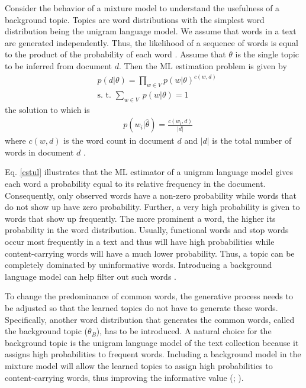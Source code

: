 \documentclass[11pt,a4paper,english,oneside]{book}
\numberwithin{equation}{chapter}
\begin{document}
Consider the behavior of a mixture model to understand the usefulness of a background topic. Topics are word distributions with the simplest word distribution being the unigram language model. We assume that words in a text are generated independently. Thus, the likelihood of a sequence of words is equal to the product of the probability of each word \citep[pp. 51--54]{Zhai.2016}. Assume that $\theta$ is the single topic to be inferred from document $d$. Then the ML estimation problem is given by
\begin{align}
\label{ul} & p(d|\theta) = \underset{w \in V}\prod p(w|\theta)^{c(w,d)}\\
\label{constraintsul} & \text{s. t. } \underset{w \in V}{\sum} \ p(w|\theta) = 1
\end{align}
the solution to which is
\begin{align}
\label{estul} & \ p(w_i|\hat{\theta}) = \frac{c(w_i,d)}{|d|}
\end{align}
where $c(w,d)$ is the word count in document $d$ and $|d|$ is the total number of words in document $d$ \citep[pp. 341--343]{Zhai.2016}. 

Eq. \ref{estul} illustrates that the ML estimator of a unigram language model gives each word a probability equal to its relative frequency in the document. Consequently, only observed words have a non-zero probability while words that do not show up have zero probability. Further, a very high probability is given to words that show up frequently. The more prominent a word, the higher its probability in the word distribution. 
Usually, functional words and stop words occur most frequently in a text and thus will have high probabilities while content-carrying words will have a much lower probability. Thus, a topic can be completely dominated by uninformative words. Introducing a background language model can help filter out such words \citep[pp. 51--54]{Zhai.2016}.  

To change the predominance of common words, the generative process needs to be adjusted so that the learned topics do not have to generate these words. Specifically, another word distribution that generates the common words, called the background topic ($\theta_B$), has to be introduced. A natural choice for the background topic is the unigram language model of the text collection because it assigns high probabilities to frequent words. Including a background model in the mixture model will allow the learned topics to assign high probabilities to content-carrying words, thus improving the informative value (\citealp[pp. 7--8]{Darling.2011}; \citealp{Chem.2007}).  
\end{document}
